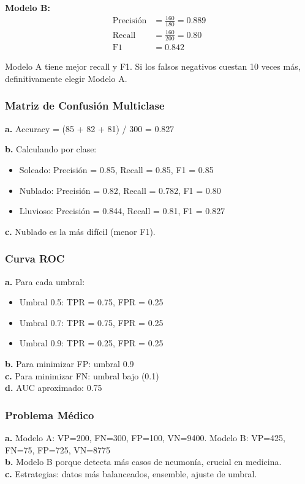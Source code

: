 \documentclass[12pt]{article}
\begin{document}
\textbf{Modelo B:}
\begin{align*}
\text{Precisión} &= \frac{160}{180} = 0.889 \\
\text{Recall} &= \frac{160}{200} = 0.80 \\
\text{F1} &= 0.842
\end{align*}

Modelo A tiene mejor recall y F1. Si los falsos negativos cuestan 10 veces más, definitivamente elegir Modelo A.

\subsubsection{Matriz de Confusión Multiclase}

\textbf{a.} Accuracy = (85 + 82 + 81) / 300 = 0.827

\textbf{b.} Calculando por clase:
\begin{itemize}
    \item Soleado: Precisión = 0.85, Recall = 0.85, F1 = 0.85
    \item Nublado: Precisión = 0.82, Recall = 0.782, F1 = 0.80
    \item Lluvioso: Precisión = 0.844, Recall = 0.81, F1 = 0.827
\end{itemize}

\textbf{c.} Nublado es la más difícil (menor F1).

\subsubsection{Curva ROC}

\textbf{a.} Para cada umbral:
\begin{itemize}
    \item Umbral 0.5: TPR = 0.75, FPR = 0.25
    \item Umbral 0.7: TPR = 0.75, FPR = 0.25
    \item Umbral 0.9: TPR = 0.25, FPR = 0.25
\end{itemize}

\textbf{b.} Para minimizar FP: umbral 0.9 \\
\textbf{c.} Para minimizar FN: umbral bajo (0.1) \\
\textbf{d.} AUC aproximado: 0.75

\subsubsection{Problema Médico}

\textbf{a.} Modelo A: VP=200, FN=300, FP=100, VN=9400. Modelo B: VP=425, FN=75, FP=725, VN=8775 \\
\textbf{b.} Modelo B porque detecta más casos de neumonía, crucial en medicina. \\
\textbf{c.} Estrategias: datos más balanceados, ensemble, ajuste de umbral.
\end{document}
